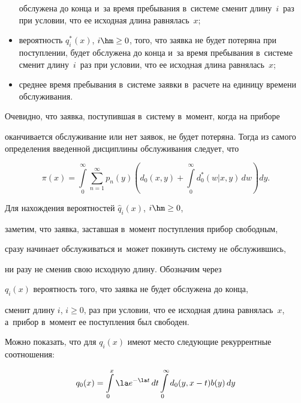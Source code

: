 \begin{multicols}{2}
\begin{itemize}
обслужена до конца и~за время пребывания в~сис\-те\-ме сменит длину~$i$~раз при условии, что ее исходная длина равнялась~$x$;


\item вероятность $q_i^*(x)$, $i\hm\ge 0$, того, что заявка не будет потеряна при поступлении, будет обслужена до конца и~за время пребывания в~системе сменит длину~$i$~раз при условии, что ее исходная длина равнялась~$x$;


\item среднее время пребывания в~системе заявки в~расчете на единицу времени обслуживания.


\end{itemize}





Очевидно, что заявка, поступившая в~систему в~момент, когда на приборе


оканчивается обслуживание или нет заявок, не будет потеряна. Тогда из самого определения введенной дисциплины обслуживания следует, что


$$


\pi(x)= \int\limits_0^\infty \! \sum\limits_{n=1}^\infty p_n(y)


\left(\!d_0(x,y)+\!\int\limits_0^\infty\! d_0^*(w|x,y)\, dw\!\right)dy.


$$








Для нахождения вероятностей ${\widehat{q}_i(x)}$, $i\hm\ge 0$,


заметим, что заявка, заставшая в~момент поступления прибор свободным,


сразу начинает обслуживаться и~может покинуть систему не обслужившись,


ни разу не сменив свою исходную длину. Обозначим через


${q}_i(x)$ вероятность того, что заявка не будет обслужена до конца,


сменит длину $i$, $i\ge 0$, раз при условии, что ее исходная длина равнялась~$x$, а~прибор в~момент ее поступления был свободен.


Можно показать, что для ${q}_i(x)$  имеют место следующие рекуррентные соотношения:


\begin{multline*}


{q}_0(x)= \int\limits_0^x \la e^{-\la t}\,dt


\int\limits_0^\infty d_0(y,x-t) b(y)\, dy



\end{multline*}
\end{multicols}
